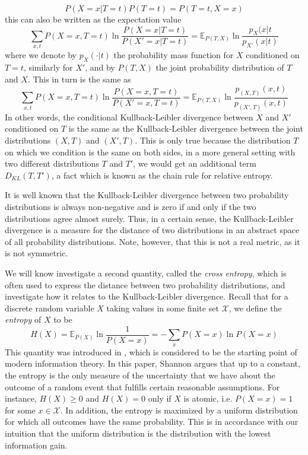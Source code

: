 \documentclass[a4paper, draft]{report}
\numberwithin{section}{chapter}
\numberwithin{equation}{chapter}
\theoremstyle{own}
\theoremstyle{remark}
\begin{document}
$$
P(X = x | T = t) P(T = t) = P(T = t, X = x)
$$
this can also be written as the expectation value
$$
\sum_{x,t} P(X = x, T = t) \ln \frac{P(X = x | T = t)}{P(X' = x | T = t)} = \mathbb{E}_{P(T,X)} \ln \frac{p_{X}(x|t}{p_{X'}(x | t)}
$$
where we denote by $p_X(\cdot | t)$ the probability mass function for $X$ conditioned on $T = t$, similarly for $X'$, and by $P(T,X)$ the joint probability distribution of $T$ and $X$. 
This in turn is the same as
$$
\sum_{x,t} P(X = x, T = t) \ln \frac{P(X = x , T = t)}{P(X' = x , T = t)} = \mathbb{E}_{P(T,X)} \ln \frac{p_{(X,T)}(x,t)}{p_{(X',T)}(x,t)}
$$
In other words, the conditional Kullback-Leibler divergence between $X$ and $X'$ conditioned on $T$ is the same as the Kullback-Leibler divergence between the joint distributions $(X,T)$ and $(X',T)$. This is only true because the distribution $T$ on which we condition is the same on both sides, in a more general setting with two different distributions $T$ and $T'$, we would get an additional term $D_{KL}(T,T')$, a fact which is known as the chain rule for relative entropy.

It is well known that the Kullback-Leibler divergence between two probability distributions is always non-negative and is zero if and only if the two distributions agree almost surely. Thus, in a certain sense, the Kullback-Leibler divergence is a measure for the distance of two distributions in an abstract space of all probability distributions. Note, however, that this is not a real metric, as it is not symmetric.

We will know investigate a second quantity, called the {\em cross entropy}, which is often used to express the distance between two probability distributions, and investigate how it relates to the Kullback-Leibler divergence. Recall that for a discrete random variable $X$ taking values in some finite set $\mathcal X$, we define the {\em entropy} of $X$ to be
$$
H(X) = {\mathbb{E}}_{P(X)} \ln \frac{1}{P(X = x)} = - \sum_x P(X = x) \ln P(X = x)
$$
This quantity was introduced in \cite{Shannon}, which is considered to be the starting point of modern information theory. In this paper, Shannon argues that up to a constant, the entropy is the only measure of the uncertainty that we have about the outcome of a random event that fulfills certain reasonable assumptions. For instance, $H(X) \geq 0$ and $H(X) = 0$ only if $X$ is atomic, i.e. $P(X = x) = 1$ for some $x \in {\mathcal X}$. In addition, the entropy is maximized by a uniform distribution for which all outcomes have the same probability. This is in accordance with our
intuition that the uniform distribution is the distribution with the lowest information gain. 
\end{document}
